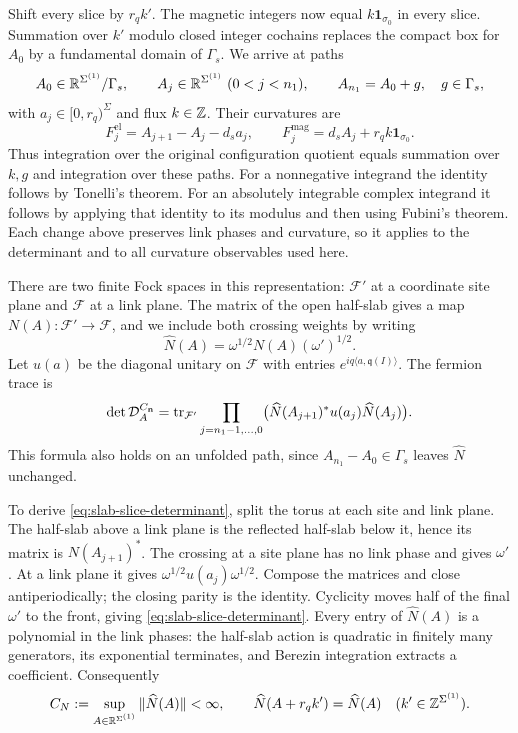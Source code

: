 Shift every slice by $r_qk'$. The magnetic integers now equal
$k\mathbf1_{\sigma_0}$ in every slice. Summation over $k'$ modulo
closed integer cochains replaces the compact box for $A_0$ by a
fundamental domain of $\Gamma_s$. We arrive at paths
\[
 A_0\in\mathbb R^{\Sigma^{(1)}}/\Gamma_s,\qquad
 A_j\in\mathbb R^{\Sigma^{(1)}}\ (0<j<n_1),\qquad
 A_{n_1}=A_0+g,\quad g\in\Gamma_s,
\]
with $a_j\in[0,r_q)^{\Sigma}$ and flux $k\in\mathbb Z$. Their curvatures are
\begin{equation}\label{eq:slab-unfolded-curvatures}
 F_j^{\mathrm{el}}=A_{j+1}-A_j-d_sa_j,
 \qquad F_j^{\mathrm{mag}}=d_sA_j+r_qk\mathbf1_{\sigma_0}.
\end{equation}
Thus integration over the original configuration quotient equals
summation over $k,g$ and integration over these paths. For a
nonnegative integrand the identity follows by Tonelli's theorem. For
an absolutely integrable complex integrand it follows by applying
that identity to its modulus and then using Fubini's theorem. Each
change above preserves link phases and curvature, so it applies to
the determinant and to all curvature observables used here.

There are two finite Fock spaces in this representation: $\mathcal F'$
at a coordinate site plane and $\mathcal F$ at a link plane. The
matrix of the open half-slab gives a map
$N(A):\mathcal F'\to\mathcal F$, and we include both crossing weights
by writing
\[
 \widehat N(A)=\omega^{1/2}N(A)(\omega')^{1/2}.
\]
Let $u(a)$ be the diagonal unitary on $\mathcal F$ with entries
$e^{iq\langle a,\mathfrak q(I)\rangle}$. The fermion trace is
\begin{equation}\label{eq:slab-slice-determinant}
 \det \mathcal D_A^{C_{\mathbf n}}=
    \operatorname{tr}_{\mathcal F'}\prod_{j=n_1-1,\ldots,0}
             \bigl(\widehat N(A_{j+1})^*u(a_j)\widehat N(A_j)\bigr).
\end{equation}
This formula also holds on an unfolded path, since
$A_{n_1}-A_0\in\Gamma_s$ leaves $\widehat N$ unchanged.

To derive \eqref{eq:slab-slice-determinant}, split the torus at each
site and link plane. The half-slab above a link plane is the reflected
half-slab below it, hence its matrix is $N(A_{j+1})^*$. The crossing
at a site plane has no link phase and gives $\omega'$. At a link
plane it gives $\omega^{1/2}u(a_j)\omega^{1/2}$. Compose the matrices
and close antiperiodically; the closing parity is the identity.
Cyclicity moves half of the final $\omega'$ to the front, giving
\eqref{eq:slab-slice-determinant}. Every entry of $\widehat N(A)$ is
a polynomial in the link phases: the half-slab action is quadratic
in finitely many generators, its exponential terminates, and
Berezin integration extracts a coefficient. Consequently
\begin{equation}\label{eq:slab-half-matrix-bound}
 C_N:=\sup_{A\in\mathbb R^{\Sigma^{(1)}}}\|\widehat N(A)\|<\infty,
 \qquad\widehat N(A+r_qk')=\widehat N(A)
       \quad(k'\in\mathbb Z^{\Sigma^{(1)}}).
\end{equation}


